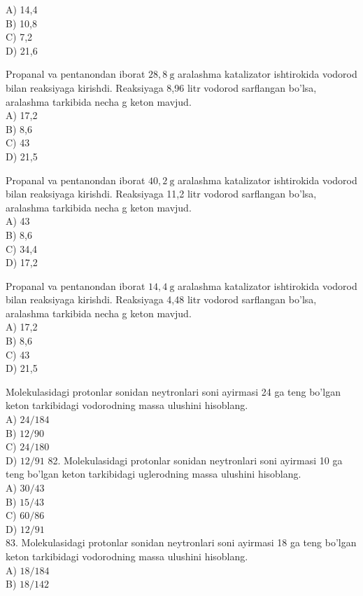 A) 14,4\\
B) 10,8\\
C) 7,2\\
D) 21,6
  \item Propanal va pentanondan iborat $28,8 \mathrm{~g}$ aralashma katalizator ishtirokida vodorod bilan reaksiyaga kirishdi. Reaksiyaga 8,96 litr vodorod sarflangan bo'lsa, aralashma tarkibida necha g keton mavjud.\\
A) 17,2\\
B) 8,6\\
C) 43\\
D) 21,5
  \item Propanal va pentanondan iborat $40,2 \mathrm{~g}$ aralashma katalizator ishtirokida vodorod bilan reaksiyaga kirishdi. Reaksiyaga 11,2 litr vodorod sarflangan bo'lsa, aralashma tarkibida necha g keton mavjud.\\
A) 43\\
B) 8,6\\
C) 34,4\\
D) 17,2
  \item Propanal va pentanondan iborat $14,4 \mathrm{~g}$ aralashma katalizator ishtirokida vodorod bilan reaksiyaga kirishdi. Reaksiyaga 4,48 litr vodorod sarflangan bo'lsa, aralashma tarkibida necha g keton mavjud.\\
A) 17,2\\
B) 8,6\\
C) 43\\
D) 21,5
  \item Molekulasidagi protonlar sonidan neytronlari soni ayirmasi 24 ga teng bo'lgan keton tarkibidagi vodorodning massa ulushini hisoblang.\\
A) $24 / 184$\\
B) $12 / 90$\\
C) $24 / 180$\\
D) $12 / 91$
82. Molekulasidagi protonlar sonidan neytronlari soni ayirmasi 10 ga teng bo'lgan keton tarkibidagi uglerodning massa ulushini hisoblang.\\
A) $30 / 43$\\
B) $15 / 43$\\
C) $60 / 86$\\
D) $12 / 91$\\
83. Molekulasidagi protonlar sonidan neytronlari soni ayirmasi 18 ga teng bo'lgan keton tarkibidagi vodorodning massa ulushini hisoblang.\\
A) $18 / 184$\\
B) $18 / 142$\\
